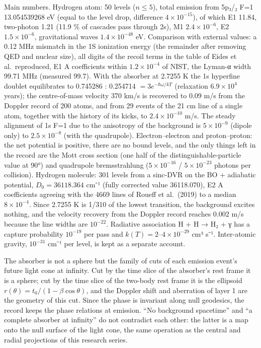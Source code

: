 \documentclass[
  a4paper,
]{article}
\begin{document}
Main numbers. Hydrogen atom: 50 levels (\(n\le5\)), total emission from
5p₃/₂ F=1 13.054539268 eV (equal to the level drop, difference
\(4\times10^{-15}\)), of which E1 11.84, two-photon 1.21 (11.9 \% of
cascades pass through 2s), M1 \(2.4\times10^{-6}\), E2
\(1.5\times10^{-6}\), gravitational waves \(1.4\times10^{-48}\) eV.
Comparison with external values: a 0.12 MHz mismatch in the 1S
ionization energy (the remainder after removing QED and nuclear size),
all digits of the recoil terms in the table of Eides et al.~reproduced,
E1 A coefficients within \(1.2\times10^{-4}\) of NIST, the Lyman-α width
99.71 MHz (measured 99.7). With the absorber at 2.7255 K the 1s
hyperfine doublet equilibrates to 0.745286 : 0.254714
\(=3e^{-\hbar\omega/kT}\) (relaxation \(6.9\times10^4\) years); the
centre-of-mass velocity 370 km/s is recovered to 0.09 m/s from the
Doppler record of 200 atoms, and from 29 events of the 21 cm line of a
single atom, together with the history of its kicks, to
\(2.4\times10^{-10}\) m/s. The steady alignment of 1s F=1 due to the
anisotropy of the background is \(5\times10^{-9}\) (dipole only) to
\(2.5\times10^{-8}\) (with the quadrupole). Electron--electron and
proton--proton: the net potential is positive, there are no bound
levels, and the only things left in the record are the Mott cross
section (one half of the distinguishable-particle value at 90°) and
quadrupole bremsstrahlung (\(5\times10^{-16}\) / \(5\times10^{-23}\)
photons per collision). Hydrogen molecule: 301 levels from a sinc-DVR on
the BO + adiabatic potential, \(D_0=36118.364\) cm⁻¹ (fully corrected
value 36118.070), E2 A coefficients agreeing with the 4669 lines of
Roueff et al.~(2019) to a median \(8\times10^{-4}\). Since 2.7255 K is
1/310 of the lowest transition, the background excites nothing, and the
velocity recovery from the Doppler record reaches 0.002 m/s because the
line widths are \(10^{-22}\). Radiative association H + H → H₂ + γ has a
capture probability \(10^{-19}\) per pass and
\(k(T)=2\)--\(4\times10^{-29}\) cm³ s⁻¹. Inter-atomic gravity,
\(10^{-31}\) cm⁻¹ per level, is kept as a separate account.

The absorber is not a sphere but the family of cuts of each emission
event's future light cone at infinity. Cut by the time slice of the
absorber's rest frame it is a sphere; cut by the time slice of the
two-body rest frame it is the ellipsoid
\(r(\theta)=t_0/(1-\beta\cos\theta)\), and the Doppler shift and
aberration of layer 1 are the geometry of this cut. Since the phase is
invariant along null geodesics, the record keeps the phase relations at
emission. ``No background spacetime'' and ``a complete absorber at
infinity'' do not contradict each other: the latter is a map onto the
null surface of the light cone, the same operation as the central and
radial projections of this research series.
\end{document}
